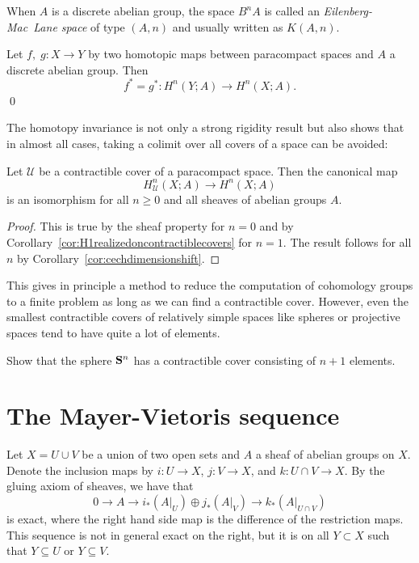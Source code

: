 \documentclass[a4paper,openany]{scrbook}
\begin{document}
\begin{defn}
When $A$ is a discrete abelian group, the space $B^nA$ is called an \emph{Eilenberg-Mac~Lane space} of type $(A,n)$ and usually written as $K(A,n)$.
\end{defn}

\begin{corollary}\label{cor:cechcohomologyhomotopyinvariance}
Let $f,\;g\colon X \to Y$ by two homotopic maps between paracompact spaces and $A$ a discrete abelian group. Then
\[
f^*=g^*\colon H^n(Y;A) \to H^n(X;A).
\] \qed 
\end{corollary}


The homotopy invariance is not only a strong rigidity result but also shows that in almost all cases, taking a colimit over all covers of a space can be avoided:

\begin{thm}\label{thm:contractible-covers}
Let $\mathcal U$ be a contractible cover of a paracompact space. Then the canonical map
\[
H^n_{\mathcal U}(X;A) \to H^n(X;A) 
\]
is an isomorphism for all $n \geq 0$ and all sheaves of abelian groups $A$.
\end{thm}
\begin{proof}
This is true by the sheaf property for $n=0$ and by Corollary~\ref{cor:H1realizedoncontractiblecovers} for $n=1$. The result follows for all $n$ by Corollary~\ref{cor:cechdimensionshift}. 
\end{proof}

This gives in principle a method to reduce the computation of cohomology groups to a finite problem as long as we can find a contractible cover. However, even the smallest contractible covers of relatively simple spaces like spheres or projective spaces tend to have quite a lot of elements.

\begin{exer}
Show that the sphere $\S^n$ has a contractible cover consisting of $n+1$ elements.
\end{exer}



\section{The Mayer-Vietoris sequence}

Let $X=U \cup V$ be a union of two open sets and $A$ a sheaf of abelian groups on $X$. Denote the inclusion maps by $i\colon U \to X$, $j\colon V \to X$, and $k\colon U \cap V \to X$. By the gluing axiom of sheaves, we have that
\[
0 \to A \to i_*(A|_U) \oplus j_*(A|_V) \to k_*(A|_{U \cap V})
\]
is exact, where the right hand side map is the difference of the restriction maps. This sequence is not in general exact on the right, but it is on all $Y \subset X$ such that $Y \subseteq U$ or $Y \subseteq V$.
\end{document}

